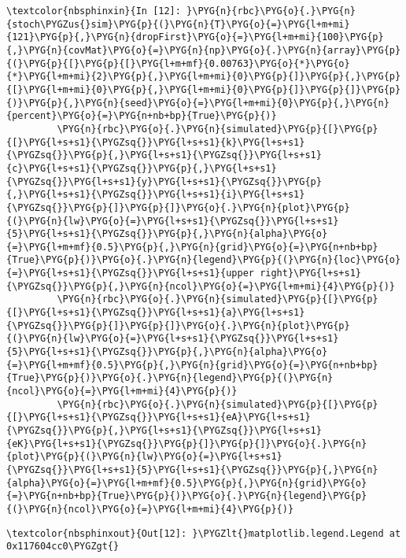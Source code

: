 \documentclass[letterpaper,10pt,openany,oneside,english]{sphinxmanual}
\begin{document}
\begin{Verbatim}[commandchars=\\\{\}]
\textcolor{nbsphinxin}{In [12]: }\PYG{n}{rbc}\PYG{o}{.}\PYG{n}{stoch\PYGZus{}sim}\PYG{p}{(}\PYG{n}{T}\PYG{o}{=}\PYG{l+m+mi}{121}\PYG{p}{,}\PYG{n}{dropFirst}\PYG{o}{=}\PYG{l+m+mi}{100}\PYG{p}{,}\PYG{n}{covMat}\PYG{o}{=}\PYG{n}{np}\PYG{o}{.}\PYG{n}{array}\PYG{p}{(}\PYG{p}{[}\PYG{p}{[}\PYG{l+m+mf}{0.00763}\PYG{o}{*}\PYG{o}{*}\PYG{l+m+mi}{2}\PYG{p}{,}\PYG{l+m+mi}{0}\PYG{p}{]}\PYG{p}{,}\PYG{p}{[}\PYG{l+m+mi}{0}\PYG{p}{,}\PYG{l+m+mi}{0}\PYG{p}{]}\PYG{p}{]}\PYG{p}{)}\PYG{p}{,}\PYG{n}{seed}\PYG{o}{=}\PYG{l+m+mi}{0}\PYG{p}{,}\PYG{n}{percent}\PYG{o}{=}\PYG{n+nb+bp}{True}\PYG{p}{)}
         \PYG{n}{rbc}\PYG{o}{.}\PYG{n}{simulated}\PYG{p}{[}\PYG{p}{[}\PYG{l+s+s1}{\PYGZsq{}}\PYG{l+s+s1}{k}\PYG{l+s+s1}{\PYGZsq{}}\PYG{p}{,}\PYG{l+s+s1}{\PYGZsq{}}\PYG{l+s+s1}{c}\PYG{l+s+s1}{\PYGZsq{}}\PYG{p}{,}\PYG{l+s+s1}{\PYGZsq{}}\PYG{l+s+s1}{y}\PYG{l+s+s1}{\PYGZsq{}}\PYG{p}{,}\PYG{l+s+s1}{\PYGZsq{}}\PYG{l+s+s1}{i}\PYG{l+s+s1}{\PYGZsq{}}\PYG{p}{]}\PYG{p}{]}\PYG{o}{.}\PYG{n}{plot}\PYG{p}{(}\PYG{n}{lw}\PYG{o}{=}\PYG{l+s+s1}{\PYGZsq{}}\PYG{l+s+s1}{5}\PYG{l+s+s1}{\PYGZsq{}}\PYG{p}{,}\PYG{n}{alpha}\PYG{o}{=}\PYG{l+m+mf}{0.5}\PYG{p}{,}\PYG{n}{grid}\PYG{o}{=}\PYG{n+nb+bp}{True}\PYG{p}{)}\PYG{o}{.}\PYG{n}{legend}\PYG{p}{(}\PYG{n}{loc}\PYG{o}{=}\PYG{l+s+s1}{\PYGZsq{}}\PYG{l+s+s1}{upper right}\PYG{l+s+s1}{\PYGZsq{}}\PYG{p}{,}\PYG{n}{ncol}\PYG{o}{=}\PYG{l+m+mi}{4}\PYG{p}{)}
         \PYG{n}{rbc}\PYG{o}{.}\PYG{n}{simulated}\PYG{p}{[}\PYG{p}{[}\PYG{l+s+s1}{\PYGZsq{}}\PYG{l+s+s1}{a}\PYG{l+s+s1}{\PYGZsq{}}\PYG{p}{]}\PYG{p}{]}\PYG{o}{.}\PYG{n}{plot}\PYG{p}{(}\PYG{n}{lw}\PYG{o}{=}\PYG{l+s+s1}{\PYGZsq{}}\PYG{l+s+s1}{5}\PYG{l+s+s1}{\PYGZsq{}}\PYG{p}{,}\PYG{n}{alpha}\PYG{o}{=}\PYG{l+m+mf}{0.5}\PYG{p}{,}\PYG{n}{grid}\PYG{o}{=}\PYG{n+nb+bp}{True}\PYG{p}{)}\PYG{o}{.}\PYG{n}{legend}\PYG{p}{(}\PYG{n}{ncol}\PYG{o}{=}\PYG{l+m+mi}{4}\PYG{p}{)}
         \PYG{n}{rbc}\PYG{o}{.}\PYG{n}{simulated}\PYG{p}{[}\PYG{p}{[}\PYG{l+s+s1}{\PYGZsq{}}\PYG{l+s+s1}{eA}\PYG{l+s+s1}{\PYGZsq{}}\PYG{p}{,}\PYG{l+s+s1}{\PYGZsq{}}\PYG{l+s+s1}{eK}\PYG{l+s+s1}{\PYGZsq{}}\PYG{p}{]}\PYG{p}{]}\PYG{o}{.}\PYG{n}{plot}\PYG{p}{(}\PYG{n}{lw}\PYG{o}{=}\PYG{l+s+s1}{\PYGZsq{}}\PYG{l+s+s1}{5}\PYG{l+s+s1}{\PYGZsq{}}\PYG{p}{,}\PYG{n}{alpha}\PYG{o}{=}\PYG{l+m+mf}{0.5}\PYG{p}{,}\PYG{n}{grid}\PYG{o}{=}\PYG{n+nb+bp}{True}\PYG{p}{)}\PYG{o}{.}\PYG{n}{legend}\PYG{p}{(}\PYG{n}{ncol}\PYG{o}{=}\PYG{l+m+mi}{4}\PYG{p}{)}
\end{Verbatim}

\begin{Verbatim}[commandchars=\\\{\}]
\textcolor{nbsphinxout}{Out[12]: }\PYGZlt{}matplotlib.legend.Legend at 0x117604cc0\PYGZgt{}
\end{Verbatim}
\end{document}
